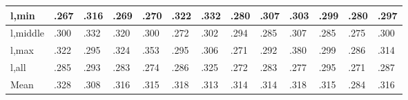\documentclass[10pt,letterpaper]{article}
\begin{document}
{\begin{tabular}{|l|l|l|l|l|l|l|l|l|l|l|l|l|}
        l,min     & .267 & .316 & .269 & .270 & .322 & .332 & .280 & .307 & .303 & .299 & .280 & .297 \\ \hline
        l,middle  & .300 & .332 & .320 & .300 & .272 & .302 & .294 & .285 & .307 & .285 & .275 & .300 \\ \hline
        l,max     & .322 & .295 & .324 & .353 & .295 & .306 & .271 & .292 & .380 & .299 & .286 & .314 \\ \hline
        l,all     & .285 & .293 & .283 & .274 & .286 & .325 & .272 & .283 & .277 & .295 & .271 & .287 \\ \hline
        Mean      & .328 & .308	& .316 & .315 &	.318 & .313 & .314 & .314 & .318 & .315	& .284 & .316 \\ \hline
    \end{tabular}
    \label{table11}    
}
\endgroup
\end{document}
